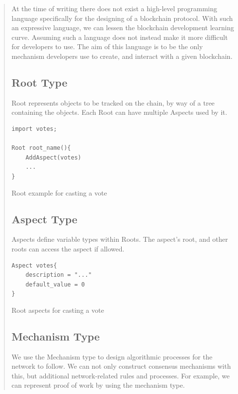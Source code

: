 \documentclass[12pt, titlepage, twocolumn]{report}
\begin{document}
\begin{quotation}
At the time of writing there does not exist a high-level programming language specifically for the designing of a blockchain protocol. With such an expressive language, we can lessen the blockchain development learning curve. Assuming such a language does not instead make it more difficult for developers to use. The aim of this language is to be the only mechanism developers use to create, and interact with a given blockchain.


\subsection{Root Type}
Root represents objects to be tracked on the chain,  by way of a tree containing the objects. Each Root can have multiple Aspects used by it.

\begin{listing}[ht]
\begin{minipage}{\linewidth}
\begin{lstlisting}
import votes;

Root root_name(){
	AddAspect(votes)
	...
}
\end{lstlisting}
\end{minipage}
\caption{Root example for casting a vote}
\label{code:2}
\end{listing}


\subsection{Aspect Type}
Aspects define variable types within Roots. The aspect's root, and other roots can access the aspect if allowed.

\begin{listing}[ht]
\begin{minipage}{\linewidth}
\begin{lstlisting}
Aspect votes{
	description = "..."
	default_value = 0
}

\end{lstlisting}
\end{minipage}
\caption{Root aspects for casting a vote}
\label{code:4}
\end{listing}



\subsection{Mechanism Type}
We use the Mechanism type to design algorithmic processes for the network to follow. We can not only construct consensus mechanisms with this, but additional network-related rules and processes. For example, we can represent proof of work by using the mechanism type.


\end{quotation}
\end{document}

